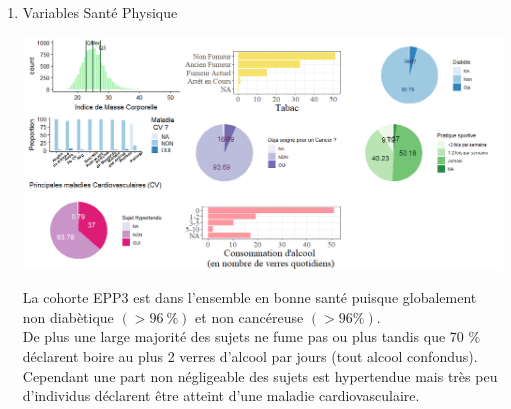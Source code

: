 \documentclass{book}
\begin{document}
\begin{enumerate}
\bigskip
\item Variables Santé Physique
\begin{center}
\includegraphics[scale=.45]{tab_var_sante_phys.png}
\end{center}

\noindent
La cohorte EPP3 est dans l'ensemble en bonne santé puisque globalement non diabètique $(> 96 ~ \%)$ et non cancéreuse $(> 96 \%)$.\\

\noindent
De plus une large majorité des sujets ne fume pas ou plus tandis que 70 $\%$ déclarent boire au plus 2 verres d'alcool par jours (tout alcool confondus).\\

\noindent
Cependant une part non négligeable des sujets est hypertendue mais très peu d'individus déclarent être atteint d'une maladie cardiovasculaire.\\


\end{enumerate}
\end{document}

